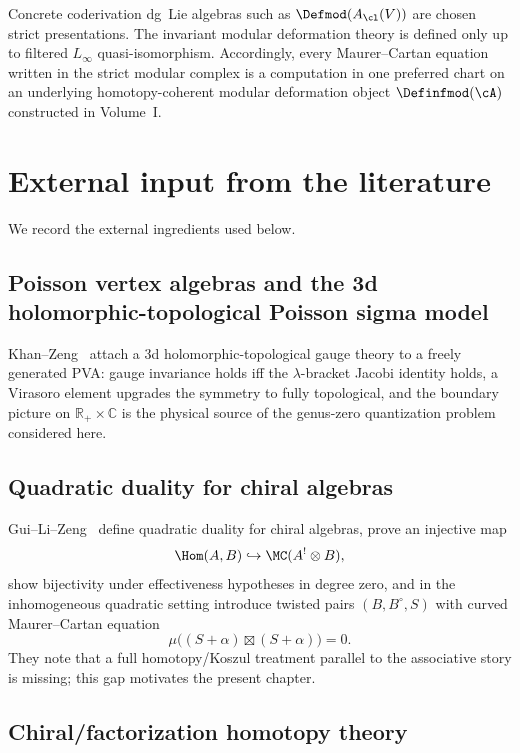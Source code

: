 \begin{convention}
\label{conv:modular-pva-strict-versus-homotopy}
Concrete coderivation dg~Lie algebras such as
$\Defmod(A_{\cl}(V))$ are chosen strict presentations. The invariant
modular deformation theory is defined only up to filtered
$L_\infty$ quasi-isomorphism. Accordingly, every Maurer--Cartan equation
written in the strict modular complex is a computation in
one preferred chart on an underlying homotopy-coherent modular
deformation object $\Definfmod(\cA)$ constructed in Volume~I.
\end{convention}

\section{External input from the literature}

We record the external ingredients used below.

\subsection{Poisson vertex algebras and the 3d holomorphic-topological Poisson sigma model}

Khan--Zeng~\cite{KZ25} attach a 3d holomorphic-topological gauge theory to a freely generated PVA: gauge invariance holds iff the $\lambda$-bracket Jacobi identity holds, a Virasoro element upgrades the symmetry to fully topological, and the boundary picture on $\mathbb R_+\times \mathbb C$ is the physical source of the genus-zero quantization problem considered here.

\subsection{Quadratic duality for chiral algebras}

Gui--Li--Zeng~\cite{GLZ22} define quadratic duality for chiral algebras, prove an injective map
\[
\Hom(A,B)\hookrightarrow \MC(A^!\otimes B),
\]
show bijectivity under effectiveness hypotheses in degree zero, and in the inhomogeneous
quadratic setting introduce twisted pairs $(B,B^\circ,S)$ with curved
Maurer--Cartan equation
\[
\mu\big((S+\alpha)\boxtimes (S+\alpha)\big)=0.
\]
They note that a full homotopy/Koszul treatment parallel to the
associative story is missing; this gap motivates the present chapter.

\subsection{Chiral/factorization homotopy theory}

